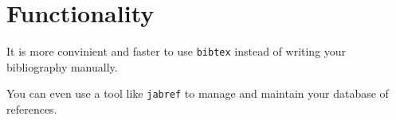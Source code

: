 \documentclass[MSc]{icldt}
\begin{document}
\chapter{Functionality}


\begin{thebibliography}{123}
\raggedright

 It is more convinient and faster to use \texttt{bibtex} instead 
of writing your bibliography manually.

You can even use a tool like \texttt{jabref} to manage and maintain your 
database of references.

\end{thebibliography}
\end{document}
